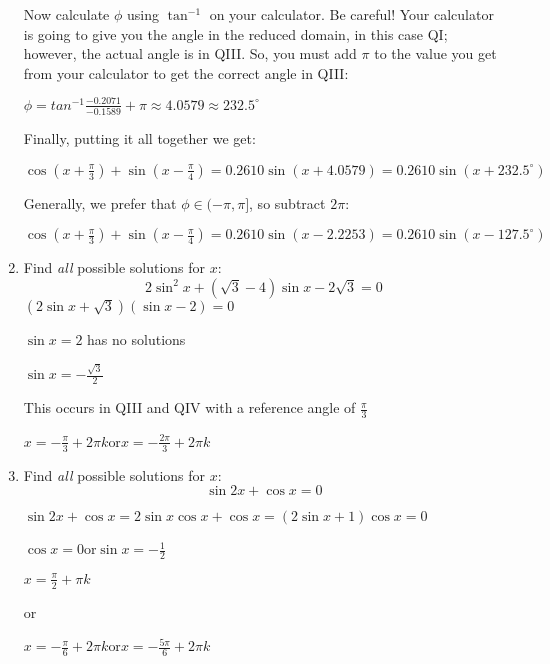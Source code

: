 \documentclass[letterpaper,12pt,fleqn]{article}
\newcommand{\p}{\phi}
\begin{document}
\begin{enumerate}
  Now calculate $\p$ using $\tan^{-1}$ on your calculator. Be careful! Your
  calculator is going to give you the angle in the reduced domain, in this
  case QI; however, the actual angle is in QIII. So, you must add $\pi$ to the
  value you get from your calculator to get the correct angle in QIII:

  $\p=tan^{-1}\frac{-0.2071}{-0.1589}+\pi\approx4.0579\approx232.5^{\circ}$

  Finally, putting it all together we get:

  $\cos\left(x+\frac{\pi}{3}\right)+\sin\left(x-\frac{\pi}{4}\right)=
  0.2610\sin(x+4.0579)=0.2610\sin(x+232.5^{\circ})$

  Generally, we prefer that $\p\in(-\pi,\pi]$, so subtract $2\pi$:

  $\cos\left(x+\frac{\pi}{3}\right)+\sin\left(x-\frac{\pi}{4}\right)=
  0.2610\sin(x-2.2253)=0.2610\sin(x-127.5^{\circ})$

\item Find \emph{all} possible solutions for $x$:
  \[2\sin^2x+(\sqrt{3}-4)\sin{x}-2\sqrt{3}=0\]
  $(2\sin{x}+\sqrt{3})(\sin{x}-2)=0$

  $\sin{x}=2$ has no solutions

  $\sin{x}=-\frac{\sqrt{3}}{2}$

  This occurs in QIII and QIV with a reference angle of $\frac{\pi}{3}$
  
  $x=-\frac{\pi}{3}+2\pi k$\qquad or\qquad$x=-\frac{2\pi}{3}+2\pi k$

\item Find \emph{all} possible solutions for $x$:
  \[\sin{2x}+\cos{x}=0\]

  $\sin2x+\cos x=2\sin x\cos x+\cos x=(2\sin x+1)\cos x=0$

  $\cos{x}=0$\qquad or\qquad$\sin{x}=-\frac{1}{2}$

  $x=\frac{\pi}{2}+\pi k$

  or
  
  $x=-\frac{\pi}{6}+2\pi k$\qquad or\qquad$x=-\frac{5\pi}{6}+2\pi k$
\end{enumerate}
 
\end{document}
